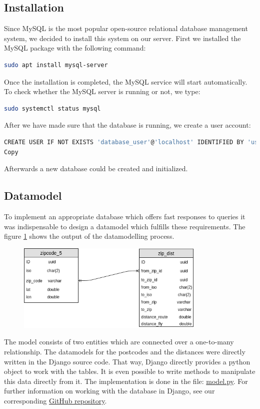 \subsection{Installation}
Since MySQL is the most popular open-source relational database management system, we decided to install this system on our server. 
First we installed the MySQL package with the following command:
\begin{lstlisting}[language=bash,breaklines=true]
sudo apt install mysql-server
\end{lstlisting}
Once the installation is completed, the MySQL service will start automatically. To check whether the MySQL server is running or not, we type:
\begin{lstlisting}[language=bash,breaklines=true]
sudo systemctl status mysql
\end{lstlisting}
After we have made sure that the database is running, we create a user account:
\begin{lstlisting}[language=bash,breaklines=true]
CREATE USER IF NOT EXISTS 'database_user'@'localhost' IDENTIFIED BY 'user_password';
Copy
\end{lstlisting}
Afterwards a new database could be created and initialized.
\subsection{Datamodel}
To implement an appropriate database which offers fast responses to queries it was indispensable to design a datamodel which fulfills these requirements. The figure \ref{pic:er} shows the output of the datamodelling process.
\begin{figure}[H]
\hspace{1.2cm}
\includegraphics[width=0.8\textwidth]{img/er}
\label{pic:er}
\end{figure}
\noindent The model consists of two entities which are connected over a one-to-many relationship.
The datamodels for the postcodes and the distances were directly written in the Django source code. That way, Django directly provides a python object to work with the tables. It is even possible to write methods to manipulate this data directly from it. The implementation is done in the file:
\href{https://github.com/dataBikeHsUlm/WebApp/blob/master/geonom/datamodel/models.py}{model.py}.
For further information on working with the database in Django, see our corresponding 
\href{https://github.com/dataBikeHsUlm/WebApp/blob/master/django_recap.md#database}{GitHub repository}.
